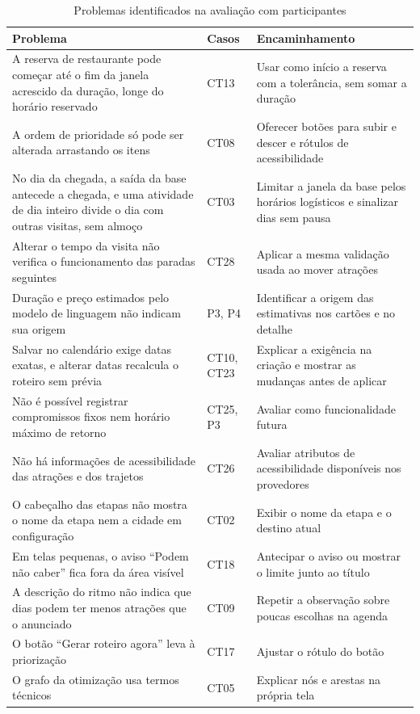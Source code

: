 \begin{table}[H]
\centering
\small
\caption{Problemas identificados na avaliação com participantes}
\label{tab:participantes-problemas}
\begin{tabularx}{\textwidth}{>{\raggedright\arraybackslash}X l >{\raggedright\arraybackslash}X}
\hline
\textbf{Problema} & \textbf{Casos} & \textbf{Encaminhamento} \\
\hline
A reserva de restaurante pode começar até o fim da janela acrescido da duração, longe do horário reservado & CT13 & Usar como início a reserva com a tolerância, sem somar a duração \\
A ordem de prioridade só pode ser alterada arrastando os itens & CT08 & Oferecer botões para subir e descer e rótulos de acessibilidade \\
No dia da chegada, a saída da base antecede a chegada, e uma atividade de dia inteiro divide o dia com outras visitas, sem almoço & CT03 & Limitar a janela da base pelos horários logísticos e sinalizar dias sem pausa \\
Alterar o tempo da visita não verifica o funcionamento das paradas seguintes & CT28 & Aplicar a mesma validação usada ao mover atrações \\
Duração e preço estimados pelo modelo de linguagem não indicam sua origem & P3, P4 & Identificar a origem das estimativas nos cartões e no detalhe \\
Salvar no calendário exige datas exatas, e alterar datas recalcula o roteiro sem prévia & CT10, CT23 & Explicar a exigência na criação e mostrar as mudanças antes de aplicar \\
Não é possível registrar compromissos fixos nem horário máximo de retorno & CT25, P3 & Avaliar como funcionalidade futura \\
Não há informações de acessibilidade das atrações e dos trajetos & CT26 & Avaliar atributos de acessibilidade disponíveis nos provedores \\
O cabeçalho das etapas não mostra o nome da etapa nem a cidade em configuração & CT02 & Exibir o nome da etapa e o destino atual \\
Em telas pequenas, o aviso ``Podem não caber'' fica fora da área visível & CT18 & Antecipar o aviso ou mostrar o limite junto ao título \\
A descrição do ritmo não indica que dias podem ter menos atrações que o anunciado & CT09 & Repetir a observação sobre poucas escolhas na agenda \\
O botão ``Gerar roteiro agora'' leva à priorização & CT17 & Ajustar o rótulo do botão \\
O grafo da otimização usa termos técnicos & CT05 & Explicar nós e arestas na própria tela \\
\hline
\end{tabularx}
\end{table}

